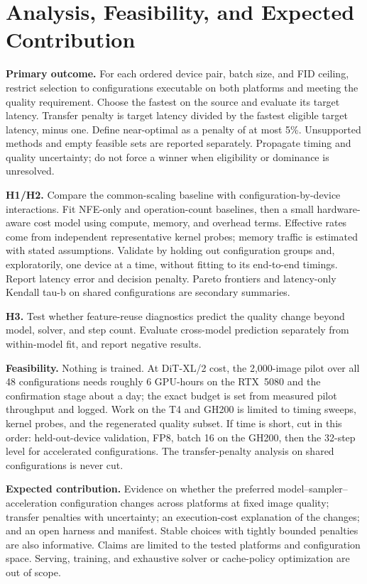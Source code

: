 \documentclass[conference]{IEEEtran}
\begin{document}
\section{Analysis, Feasibility, and Expected Contribution}

\textbf{Primary outcome.} For each ordered device pair, batch size, and FID ceiling, restrict selection to
configurations executable on both platforms and meeting the quality requirement. Choose the fastest on the
source and evaluate its target latency. Transfer penalty is target latency divided by the fastest eligible
target latency, minus one. Define near-optimal as a penalty of at most 5\%. Unsupported methods and empty
feasible sets are reported separately. Propagate timing and quality uncertainty; do not force a winner when
eligibility or dominance is unresolved.

\textbf{H1/H2.} Compare the common-scaling baseline with configuration-by-device interactions. Fit NFE-only and
operation-count baselines, then a small hardware-aware cost model using compute, memory, and overhead terms.
Effective rates come from independent representative kernel probes; memory traffic is estimated with stated
assumptions. Validate by holding out configuration groups and, exploratorily, one device at a time, without
fitting to its end-to-end timings. Report latency error and decision penalty. Pareto frontiers and
latency-only Kendall tau-b on shared configurations are secondary summaries.

\textbf{H3.} Test whether feature-reuse diagnostics predict the quality change beyond model, solver, and step
count. Evaluate cross-model prediction separately from within-model fit, and report negative results.

\textbf{Feasibility.} Nothing is trained. At DiT-XL/2 cost, the 2,000-image pilot over all 48 configurations
needs roughly 6 GPU-hours on the RTX~5080 and the confirmation stage about a day; the exact budget is set from
measured pilot throughput and logged. Work on the T4 and GH200 is limited to timing sweeps, kernel probes, and
the regenerated quality subset. If time is short, cut in this order: held-out-device validation, FP8, batch
16 on the GH200, then the 32-step level for accelerated configurations. The transfer-penalty analysis on
shared configurations is never cut.

\textbf{Expected contribution.} Evidence on whether the preferred model--sampler--acceleration configuration
changes across platforms at fixed image quality; transfer penalties with uncertainty; an execution-cost
explanation of the changes; and an open harness and manifest. Stable choices with tightly bounded penalties
are also informative. Claims are limited to the tested platforms and configuration space. Serving, training,
and exhaustive solver or cache-policy optimization are out of scope.
\end{document}
